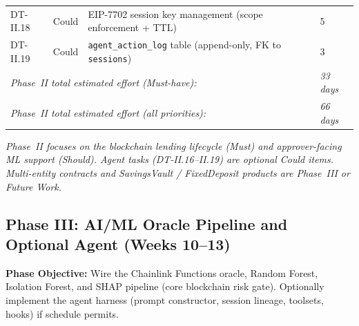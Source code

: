 \documentclass[12pt,a4paper]{report}
\begin{document}
\begin{table}[H]
\begin{tabular}{p{1.8cm}p{1.8cm}p{7.5cm}p{1.5cm}}
DT-II.18 & Could & EIP-7702 session key management (scope enforcement + TTL) & 5 \\
DT-II.19 & Could & \texttt{agent\_action\_log} table (append-only, FK to \texttt{sessions}) & 3 \\
\multicolumn{3}{l}{\textit{Phase~II total estimated effort (Must-have):}} & \textit{33 days} \\
\multicolumn{3}{l}{\textit{Phase~II total estimated effort (all priorities):}} & \textit{66 days} \\
\bottomrule
\end{tabular}
\end{table}

\vspace{2pt}
\noindent\textit{\small Phase~II focuses on the blockchain lending lifecycle (Must) and approver-facing ML support (Should). Agent tasks (DT-II.16--II.19) are optional Could items. Multi-entity contracts and SavingsVault / FixedDeposit products are Phase~III or Future Work.}


\subsection{Phase III: AI/ML Oracle Pipeline and Optional Agent (Weeks 10--13)}

\textbf{Phase Objective:} Wire the Chainlink Functions oracle, Random Forest,
Isolation Forest, and SHAP pipeline (core blockchain risk gate). Optionally implement the agent harness (prompt constructor, session lineage, toolsets, hooks) if schedule permits.
\end{document}
